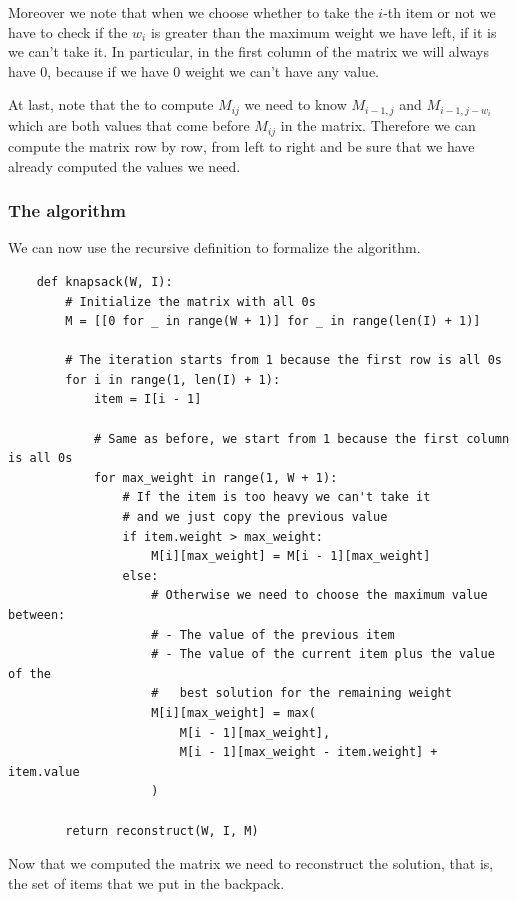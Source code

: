 \documentclass[12pt]{extarticle}
\begin{document}
Moreover we note that when we choose whether to take the $i$-th item or not we have to check if the $w_i$ is greater than the maximum weight we have left, if it is we can't take it.
In particular, in the first column of the matrix we will always have 0, because if we have 0 weight we can't have any value.

At last, note that the to compute $M_{ij}$ we need to know $M_{i-1, j}$ and $M_{i-1, j - w_i}$ which are both values that come before $M_{ij}$ in the matrix.
Therefore we can compute the matrix row by row, from left to right and be sure that we have already computed the values we need.

\subsubsection{The algorithm}

We can now use the recursive definition to formalize the algorithm.

\begin{verbatim}
    def knapsack(W, I):
        # Initialize the matrix with all 0s
        M = [[0 for _ in range(W + 1)] for _ in range(len(I) + 1)]

        # The iteration starts from 1 because the first row is all 0s
        for i in range(1, len(I) + 1):
            item = I[i - 1]

            # Same as before, we start from 1 because the first column is all 0s
            for max_weight in range(1, W + 1):
                # If the item is too heavy we can't take it
                # and we just copy the previous value
                if item.weight > max_weight:
                    M[i][max_weight] = M[i - 1][max_weight]
                else:
                    # Otherwise we need to choose the maximum value between:
                    # - The value of the previous item
                    # - The value of the current item plus the value of the
                    #   best solution for the remaining weight
                    M[i][max_weight] = max(
                        M[i - 1][max_weight],
                        M[i - 1][max_weight - item.weight] + item.value
                    )

        return reconstruct(W, I, M)
\end{verbatim}

Now that we computed the matrix we need to reconstruct the solution, that is, the set of items that we put in the backpack.
\end{document}
